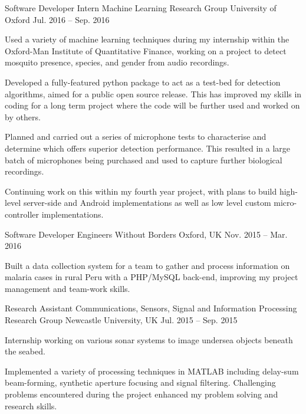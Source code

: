 \begin{cventries}
    \cventry
    {Software Developer Intern}
    {Machine Learning Research Group}
    {University of Oxford}
    {Jul. 2016 – Sep. 2016}
    {
      \begin{cvitems}
        \item {Used a variety of machine learning techniques during my internship within the Oxford-Man Institute of Quantitative Finance, working on a project to detect mosquito presence, species, and gender from audio recordings.}
        \item {Developed a fully-featured python package to act as a test-bed for detection algorithms, aimed for a public open source release. This has improved my skills in coding for a long term project where the code will be further used and worked on by others.}
        \item {Planned and carried out a series of microphone tests to characterise and determine which offers superior detection performance. This resulted in a large batch of microphones being purchased and used to capture further biological recordings.}
        \item {Continuing work on this within my fourth year project, with plans to build high-level server-side and Android implementations as well as low level custom micro-controller implementations.}
      \end{cvitems}
    }
    \cventry
    {Software Developer}
    {Engineers Without Borders}
    {Oxford, UK}
    {Nov. 2015 – Mar. 2016}
    {
      \begin{cvitems}
        \item {Built a data collection system for a team to gather and process information on malaria cases in rural Peru with a PHP/MySQL back-end, improving my project management and team-work skills.}
      \end{cvitems}
    }
  \cventry
    {Research Assistant}
    {Communications, Sensors, Signal and Information Processing Research Group}
    {Newcastle University, UK}
    {Jul. 2015 – Sep. 2015}
    {
      \begin{cvitems}
        \item {Internship working on various sonar systems to image undersea objects beneath the seabed.}
        \item {Implemented a variety of processing techniques in MATLAB including delay-sum beam-forming, synthetic
aperture focusing and signal filtering. Challenging problems encountered during the project enhanced my problem solving and research skills.}

\end{cvitems}}
\end{cventries}
